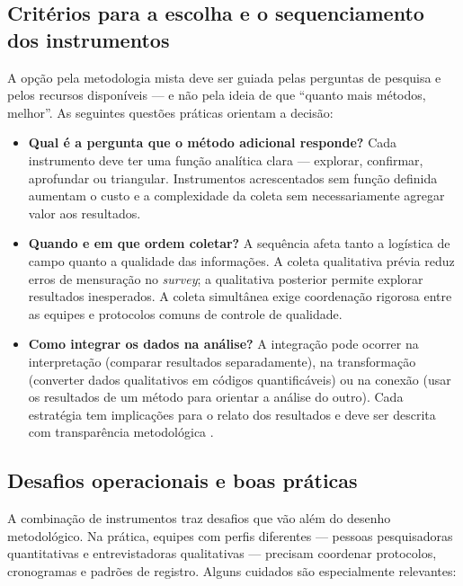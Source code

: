 \documentclass[12pt, a4paper, openany]{book}
\begin{document}
\subsection{Crit\'erios para a escolha e o sequenciamento dos instrumentos}

A op\c{c}\~ao pela metodologia mista deve ser guiada pelas perguntas de pesquisa e pelos recursos dispon\'iveis --- e n\~ao pela ideia de que ``quanto mais m\'etodos, melhor''. As seguintes quest\~oes pr\'aticas orientam a decis\~ao:

\begin{itemize}
\item \textbf{Qual \'e a pergunta que o m\'etodo adicional responde?} Cada instrumento deve ter uma fun\c{c}\~ao anal\'itica clara --- explorar, confirmar, aprofundar ou triangular. Instrumentos acrescentados sem fun\c{c}\~ao definida aumentam o custo e a complexidade da coleta sem necessariamente agregar valor aos resultados.
\item \textbf{Quando e em que ordem coletar?} A sequ\^encia afeta tanto a log\'istica de campo quanto a qualidade das informa\c{c}\~oes. A coleta qualitativa pr\'evia reduz erros de mensura\c{c}\~ao no \textit{survey}; a qualitativa posterior permite explorar resultados inesperados. A coleta simult\^anea exige coordena\c{c}\~ao rigorosa entre as equipes e protocolos comuns de controle de qualidade.
\item \textbf{Como integrar os dados na an\'alise?} A integra\c{c}\~ao pode ocorrer na interpreta\c{c}\~ao (comparar resultados separadamente), na transforma\c{c}\~ao (converter dados qualitativos em c\'odigos quantific\'aveis) ou na conex\~ao (usar os resultados de um m\'etodo para orientar a an\'alise do outro). Cada estrat\'egia tem implica\c{c}\~oes para o relato dos resultados e deve ser descrita com transpar\^encia metodol\'ogica \citep{creswell2014research,bryman2012social}.
\end{itemize}

\subsection{Desafios operacionais e boas pr\'aticas}

A combina\c{c}\~ao de instrumentos traz desafios que v\~ao al\'em do desenho metodol\'ogico. Na pr\'atica, equipes com perfis diferentes --- pessoas pesquisadoras quantitativas e entrevistadoras qualitativas --- precisam coordenar protocolos, cronogramas e padr\~oes de registro. Alguns cuidados s\~ao especialmente relevantes:
\end{document}
